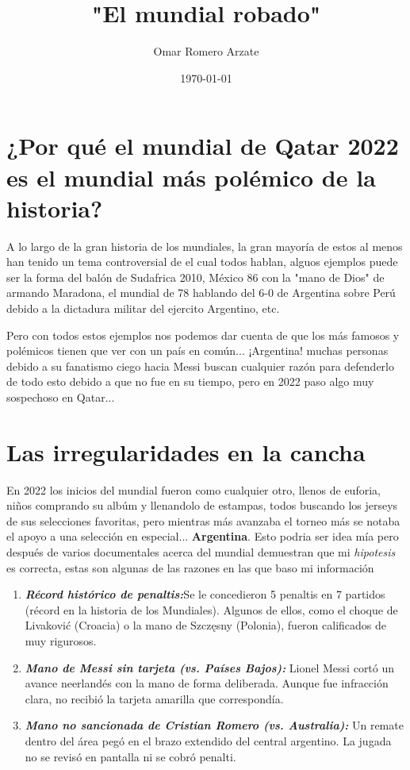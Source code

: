 \documentclass{article}
\title{"El mundial robado"}
\author{Omar Romero Arzate}
\date{\today}
\begin{document}
\maketitle

\section{¿Por qué el mundial de Qatar 2022 es el mundial más polémico de la historia?}

A lo largo de la gran historia de los mundiales, la gran mayoría de estos al menos han tenido un tema controversial de el cual todos hablan, alguos ejemplos puede ser la forma del balón de Sudafrica 2010, México 86 con la "mano de Dios" de armando Maradona, el mundial de 78 hablando del 6-0 de Argentina sobre Perú debido a la dictadura militar del ejercito Argentino, etc. \


Pero con todos estos ejemplos nos podemos dar cuenta de que los más famosos y polémicos tienen que ver con un país en común... ¡Argentina! muchas personas debido a su fanatismo ciego hacia Messi buscan cualquier razón para defenderlo de todo esto debido a que no fue en su tiempo, pero en 2022 paso algo muy sospechoso en Qatar... \newline

\section{Las irregularidades en la cancha}
En 2022 los inicios del mundial fueron como cualquier otro, llenos de euforia, niños comprando su albúm y llenandolo de estampas, todos buscando los jerseys de sus selecciones favoritas, pero mientras más avanzaba el torneo más se notaba el apoyo a una selección en especial... \textbf{Argentina}. \newline
Esto podria ser idea mía pero después de varios documentales acerca del mundial demuestran que mi \textit{hipotesis} es correcta, estas son algunas de las razones en las que baso mi información 

\begin{enumerate}

  \item \textbf{\textit{Récord histórico de penaltis:}}Se le concedieron 5 penaltis en 7 partidos (récord en la historia de los Mundiales). Algunos de ellos, como el choque de Livaković (Croacia) o la mano de Szczęsny (Polonia), fueron calificados de muy rigurosos.
  
  \item \textbf{\textit{Mano de Messi sin tarjeta (vs. Países Bajos): }} Lionel Messi cortó un avance neerlandés con la mano de forma deliberada. Aunque fue infracción clara, no recibió la tarjeta amarilla que correspondía.
  
  \item \textbf{\textit{Mano no sancionada de Cristian Romero (vs. Australia):}} Un remate dentro del área pegó en el brazo extendido del central argentino. La jugada no se revisó en pantalla ni se cobró penalti.
 

\end{enumerate}
\end{document}
